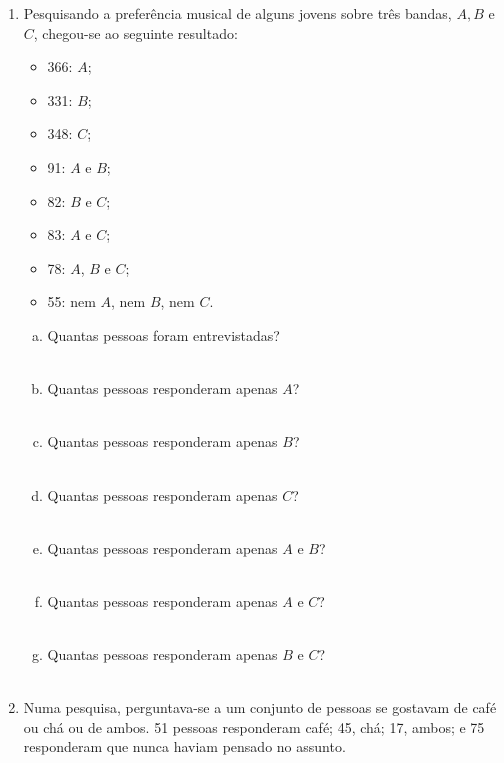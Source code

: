 \documentclass[a4paper,14pt]{article}
\begin{document}
	\begin{multicols}{2}
    	\begin{enumerate}
    		\item Pesquisando a preferência musical de alguns jovens sobre três bandas, $A, B$ e $C$, chegou-se ao seguinte resultado:
    		\begin{itemize}
    			\item 366: $A$;
    			\item 331: $B$;
    			\item 348: $C$;
    			\item 91: $A$ e $B$;
    			\item 82: $B$ e $C$;
    			\item 83: $A$ e $C$;
    			\item 78: $A$, $B$ e $C$;
    			\item 55: nem $A$, nem $B$, nem $C$.
    		\end{itemize}
    	\begin{enumerate}[a)]
    		\item Quantas pessoas foram entrevistadas? \\\\
    		\item Quantas pessoas responderam apenas $A$? \\\\
    		\item Quantas pessoas responderam apenas $B$? \\\\
    		\item Quantas pessoas responderam apenas $C$? \\\\
    		\item Quantas pessoas responderam apenas $A$ e $B$? \\\\
    		\item Quantas pessoas responderam apenas $A$ e $C$? \\\\
    		\item Quantas pessoas responderam apenas $B$ e $C$? \\\\
    	\end{enumerate}
    	\item Numa pesquisa, perguntava-se a um conjunto de pessoas se gostavam de café ou chá ou de ambos. 51 pessoas responderam café; 45, chá; 17, ambos; e 75 responderam que nunca haviam pensado no assunto.
    	\begin{enumerate}[a)]

\end{enumerate}
\end{enumerate}
\end{multicols}
\end{document}
